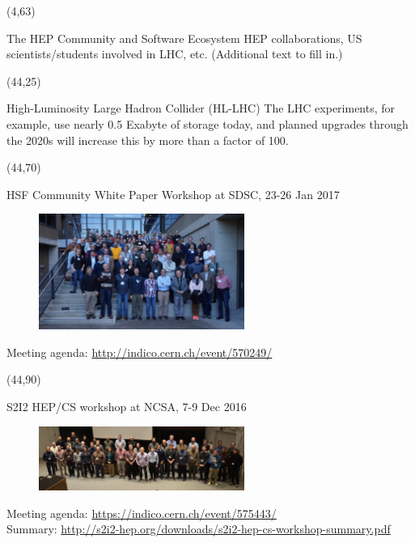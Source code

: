 \documentclass[final]{beamer}
\begin{document}
\begin{frame}{}
\begin{textblock}{38.0}(4,63)
\begin{block}{The HEP Community and Software Ecosystem}
HEP collaborations, US scientists/students involved in LHC, etc. (Additional text to fill in.)
\end{block}
\end{textblock}

\begin{textblock}{38.0}(44,25)
\begin{block}{High-Luminosity Large Hadron Collider (HL-LHC)}
The LHC experiments, for example, use nearly 0.5 Exabyte of
storage today, and planned upgrades through the 2020s will increase this
by more than a factor of 100. 
\end{block}
\end{textblock}





\begin{textblock}{38.0}(44,70)
\begin{block}{HSF Community White Paper Workshop at SDSC, 23-26 Jan 2017}
\begin{figure}[tbph]
\centering
\includegraphics[width=0.60\textwidth]{images/20170125-HSF-SDSC-Workshop-group-photo.jpg}
\end{figure}
\small{Meeting agenda: \url{http://indico.cern.ch/event/570249/}} \\

\end{block}
\end{textblock}

\begin{textblock}{38.0}(44,90)
\begin{block}{S2I2 HEP/CS workshop at NCSA, 7-9 Dec 2016}
\begin{figure}[tbph]
\centering
\includegraphics[width=0.60\textwidth]{images/20161208-s2i2-hep-cs-group-photo.jpg}
\end{figure}
\small{Meeting agenda: \url{https://indico.cern.ch/event/575443/}} \\
\small{Summary: \url{http://s2i2-hep.org/downloads/s2i2-hep-cs-workshop-summary.pdf}}
\end{block}
\end{textblock}









\end{frame}
\end{document}
